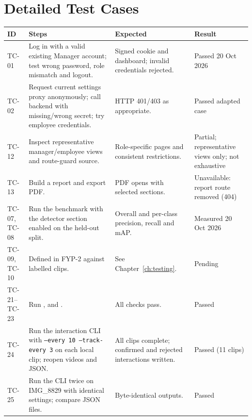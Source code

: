 \chapter{Detailed Test Cases}
\label{app:tests}
\begin{longtable}{P{0.09\textwidth}P{0.35\textwidth}P{0.3\textwidth}P{0.14\textwidth}}
\toprule
ID & Steps & Expected & Result\\
\midrule
\endhead
TC-01 & Log in with a valid existing Manager account; test wrong password, role mismatch and logout. & Signed cookie and dashboard; invalid credentials rejected. & Passed 20 Oct 2026\\
TC-02 & Request current settings proxy anonymously; call backend with missing/wrong secret; try employee credentials. & HTTP 401/403 as appropriate. & Passed adapted case\\
TC-12 & Inspect representative manager/employee views and route-guard source. & Role-specific pages and consistent restrictions. & Partial; representative views only; not exhaustive\\
TC-13 & Build a report and export PDF. & PDF opens with selected sections. & Unavailable: report route removed (404)\\
TC-07, TC-08 & Run the benchmark with the detector section enabled on the held-out split. & Overall and per-class precision, recall and mAP. & Measured 20 Oct 2026\\
TC-09, TC-10 & Defined in FYP-2 against labelled clips. & See Chapter~\ref{ch:testing}. & Pending\\
TC-21--TC-23 & Run ,  and . & All checks pass. & Passed\\
TC-24 & Run the interaction CLI with \texttt{--every 10 --track-every 3} on each local clip; reopen videos and JSON. & All clips complete; confirmed and rejected interactions written. & Passed (11 clips)\\
TC-25 & Run the CLI twice on IMG\_8829 with identical settings; compare JSON files. & Byte-identical outputs. & Passed\\
\bottomrule
\end{longtable}

